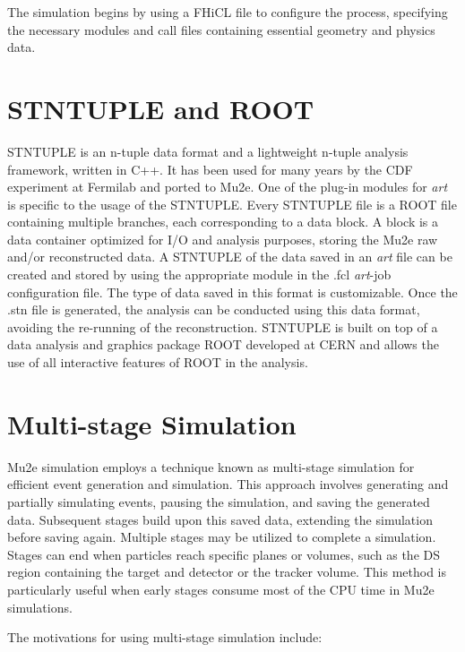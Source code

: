 The simulation begins by using a FHiCL file to configure the process, specifying 
the necessary modules and call files containing essential geometry and physics data.

\section{STNTUPLE and ROOT}

STNTUPLE is an n-tuple data format and a lightweight n-tuple analysis framework, 
written in C++. It has been used for many years by the CDF experiment at Fermilab 
and ported to Mu2e. One of the plug-in modules for \textit{art} is specific to the 
usage of the STNTUPLE. Every STNTUPLE file is a ROOT file containing multiple branches, 
each corresponding to a data block. A block is a data container optimized for I/O and 
analysis purposes, storing the Mu2e raw and/or reconstructed data. A STNTUPLE of the 
data saved in an \textit{art} file can be created and stored by using the appropriate 
module in the .fcl \textit{art}-job configuration file. The type of data saved in this 
format is customizable. Once the .stn file is generated, the analysis can be conducted 
using this data format, avoiding the re-running of the reconstruction. STNTUPLE is built 
on top of a data analysis and graphics package ROOT developed at CERN and allows the use 
of all interactive features of ROOT in the analysis.

\section{Multi-stage Simulation}

Mu2e simulation employs a technique known as multi-stage simulation for efficient event 
generation and simulation. This approach involves generating and partially simulating events, 
pausing the simulation, and saving the generated data. Subsequent stages build upon this saved 
data, extending the simulation before saving again. Multiple stages may be utilized to complete 
a simulation. Stages can end when particles reach specific planes or volumes, such as the DS 
region containing the target and detector or the tracker volume. This method is particularly 
useful when early stages consume most of the CPU time in Mu2e simulations.

The motivations for using multi-stage simulation include:

